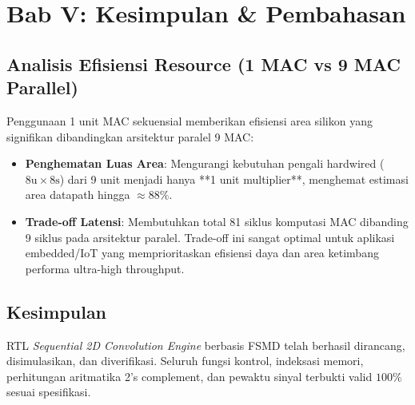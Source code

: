 \documentclass[12pt,a4paper]{article}
\begin{document}
\section{Bab V: Kesimpulan \& Pembahasan}

\subsection{Analisis Efisiensi Resource (1 MAC vs 9 MAC Parallel)}
Penggunaan 1 unit MAC sekuensial memberikan efisiensi area silikon yang signifikan dibandingkan arsitektur paralel 9 MAC:
\begin{itemize}
    \item \textbf{Penghematan Luas Area}: Mengurangi kebutuhan pengali hardwired ($8\text{u} \times 8\text{s}$) dari 9 unit menjadi hanya **1 unit multiplier**, menghemat estimasi area datapath hingga $\approx 88\%$.
    \item \textbf{Trade-off Latensi}: Membutuhkan total 81 siklus komputasi MAC dibanding 9 siklus pada arsitektur paralel. Trade-off ini sangat optimal untuk aplikasi embedded/IoT yang memprioritaskan efisiensi daya dan area ketimbang performa ultra-high throughput.
\end{itemize}

\subsection{Kesimpulan}
RTL \textit{Sequential 2D Convolution Engine} berbasis FSMD telah berhasil dirancang, disimulasikan, dan diverifikasi. Seluruh fungsi kontrol, indeksasi memori, perhitungan aritmatika 2's complement, dan pewaktu sinyal terbukti valid $100\%$ sesuai spesifikasi.
\end{document}
